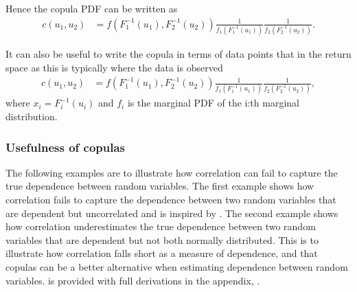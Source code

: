 Hence the copula \gls{PDF} can be written as 
\begin{align*}
    c(u_1,u_2) &= f(F_1^{-1}(u_1),F_2^{-1}(u_2)) \frac{1}{f_1(F_1^{-1}(u_1))}\frac{1}{f_2(F_2^{-1}(u_2))}. 
\end{align*}

It can also be useful to write the copula in terms of data points that in the return space as this is typically where the data is observed
\begin{align*}
    c(u_1,u_2) &= f(F_1^{-1}(u_1),F_2^{-1}(u_2)) \frac{1}{f_1(F_1^{-1}(u_1))}\frac{1}{f_2(F_2^{-1}(u_2))},
\end{align*}
where $x_i = F_i^{-1}(u_i)$ and $f_i$ is the marginal \gls{PDF} of the i:th marginal distribution. 



\subsubsection{Usefulness of copulas}

The following examples are to illustrate how correlation can fail to capture the true dependence between random variables. The first example shows how correlation fails to capture the dependence between two random variables that are dependent but uncorrelated and is inspired by . The second example shows how correlation underestimates the true dependence between two random variables that are dependent but not both normally distributed. This is to illustrate how correlation falls short as a measure of dependence, and that copulas can be a better alternative when estimating dependence between random variables.  is provided with full derivations in the appendix, .

